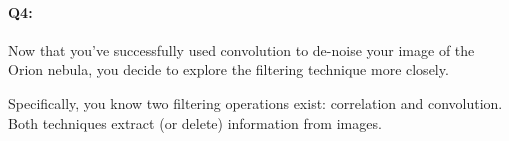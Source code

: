 


\pagebreak
\paragraph{Q4:} Now that you've successfully used convolution to de-noise your image of the Orion nebula, you decide to explore the filtering technique more closely. 

Specifically, you know two filtering operations exist: correlation and convolution. Both techniques extract (or delete) information from images.

